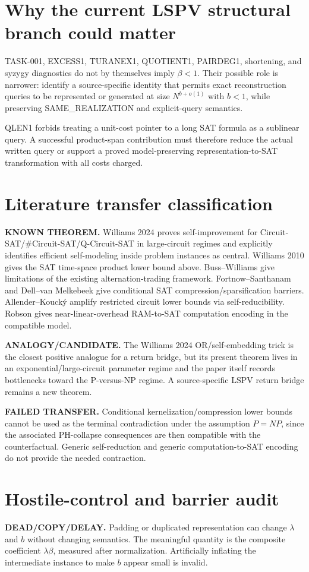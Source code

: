 \documentclass[11pt]{article}
\begin{document}
\section*{Why the current LSPV structural branch could matter}
TASK-001, EXCESS1, TURANEX1, QUOTIENT1, PAIRDEG1, shortening, and syzygy diagnostics do not by themselves imply \(\beta<1\). Their possible role is narrower: identify a source-specific identity that permits exact reconstruction queries to be represented or generated at size \(N^{b+o(1)}\) with \(b<1\), while preserving SAME\_REALIZATION and explicit-query semantics.

QLEN1 forbids treating a unit-cost pointer to a long SAT formula as a sublinear query. A successful product-span contribution must therefore reduce the actual written query or support a proved model-preserving representation-to-SAT transformation with all costs charged.

\section*{Literature transfer classification}
\textbf{KNOWN THEOREM.}
Williams 2024 proves self-improvement for Circuit-SAT/\#Circuit-SAT/Q-Circuit-SAT in large-circuit regimes and explicitly identifies efficient self-modeling inside problem instances as central. Williams 2010 gives the SAT time-space product lower bound above. Buss--Williams give limitations of the existing alternation-trading framework. Fortnow--Santhanam and Dell--van Melkebeek give conditional SAT compression/sparsification barriers. Allender--Kouck\'y amplify restricted circuit lower bounds via self-reducibility. Robson gives near-linear-overhead RAM-to-SAT computation encoding in the compatible model.

\textbf{ANALOGY/CANDIDATE.}
The Williams 2024 OR/self-embedding trick is the closest positive analogue for a return bridge, but its present theorem lives in an exponential/large-circuit parameter regime and the paper itself records bottlenecks toward the P-versus-NP regime. A source-specific LSPV return bridge remains a new theorem.

\textbf{FAILED TRANSFER.}
Conditional kernelization/compression lower bounds cannot be used as the terminal contradiction under the assumption \(P=NP\), since the associated PH-collapse consequences are then compatible with the counterfactual. Generic self-reduction and generic computation-to-SAT encoding do not provide the needed contraction.

\section*{Hostile-control and barrier audit}
\textbf{DEAD/COPY/DELAY.} Padding or duplicated representation can change \(\lambda\) and \(b\) without changing semantics. The meaningful quantity is the composite coefficient \(\lambda\beta\), measured after normalization. Artificially inflating the intermediate instance to make \(b\) appear small is invalid.
\end{document}
